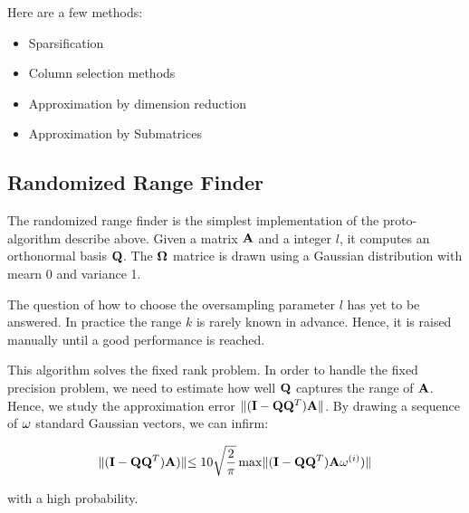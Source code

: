 \documentclass[onecolumn,12pt]{article}
\begin{document}
Here are a few methods:

\begin{itemize}
\item Sparsification
\item Column selection methods
\item Approximation by dimension reduction
\item Approximation by Submatrices
\end{itemize}

\subsection{Randomized Range Finder}

The randomized range finder is the simplest implementation of the
proto-algorithm describe above. Given a matrix $\bold{A}$ and a integer $l$,
it computes an orthonormal basis $\bold{Q}$. The $\bold{\Omega}$ matrice is
drawn using a Gaussian distribution with mearn 0 and variance 1.

\noindent{}

The question of how to choose the oversampling parameter $l$ has yet to be
answered. In practice the range $k$ is rarely known in advance. Hence, it is
raised manually until a good performance is reached.

This algorithm solves the fixed rank problem. In order to handle the fixed
precision problem, we need to estimate how well $\bold{Q}$ captures the range
of $\bold{A}$. Hence, we study the approximation error 
$\lVert (\bold{I} - \bold{Q} \bold{Q}^T) \bold{A} \lVert$. By drawing a
sequence of $\bold{\omega}$ standard Gaussian vectors, we can infirm:

\begin{equation}
\label{rrf-error}
\lVert (\bold{I} - \bold{Q}\bold{Q}^T) \bold{A})  \lVert \leq 10
\sqrt{\frac{2}{\pi}}
\max \lVert(\bold{I} - \bold{Q}\bold{Q}^T) \bold{A} \bold{\omega}^{(i)})  \lVert
\end{equation}

with a high probability.
\end{document}
